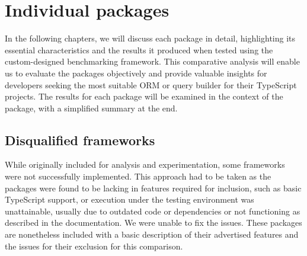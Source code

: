 \chapter{Individual packages}

In the following chapters, we will discuss each package in detail, highlighting
its essential characteristics and the results it produced when tested using the
custom-designed benchmarking framework. This comparative analysis will enable us
to evaluate the packages objectively and provide valuable insights for
developers seeking the most suitable ORM or query builder for their TypeScript
projects. The results for each package will be examined in the context of the
package, with a simplified summary at the end.











\section{Disqualified frameworks}

While originally included for analysis and experimentation, some frameworks were
not successfully implemented. This approach had to be taken as the packages were
found to be lacking in features required for inclusion, such as basic TypeScript
support, or execution under the testing environment was unattainable, usually
due to outdated code or dependencies or not functioning as described in the
documentation. We were unable to fix the issues. These packages are nonetheless
included with a basic description of their advertised features and the issues
for their exclusion for this comparison.



